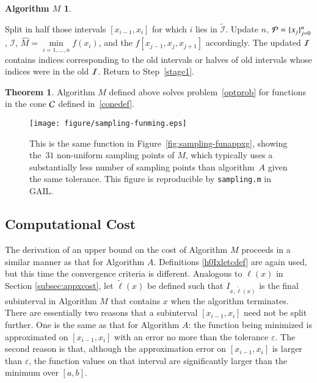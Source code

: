 \documentclass[review]{elsarticle}
\newcommand{\abstol}{\varepsilon}
\theoremstyle{definition}
\newtheorem*{algoM}{Algorithm $M$}
\newcommand{\scnote}[1]{ {\textcolor{orange}  {\mbox{**SC:} #1}}}
\newcommand{\tell}{\tilde{\ell}}
\newcommand{\hM}{\widehat{M}}
\newtheorem{theorem}{Theorem}
\newcommand{\minfi}{\min\limits_{i=1, \ldots,  n} f(x_i)} %
\begin{document}
\begin{algoM}
\begin{enumerate}[\em Step 1.]
		Split in half those intervals $[x_{i-1},x_i]$ for which $i$ lies in $\widetilde{\mathcal{I}}$.
		Update $n$, $\mathcal{P} = \{x_j\}_{j=0}^n$, $\mathcal{I}$, $\hM = \minfi$, and the $f[x_{j-1}, x_{j}, x_{j+1}]$ accordingly.  The updated $\mathcal{I}$ contains  indices corresponding to the old intervals or halves of old intervals whose indices were in the old $\mathcal{I}$.  Return to Step~\ref{stage1}.
	\end{enumerate}
\end{algoM}

\begin{theorem} \label{thm:algMworks}
Algorithm $M$ defined above solves problem~\eqref{optprob} for functions in the cone $\mathcal{C}$ defined in~\eqref{conedef}.
\end{theorem}

\begin{figure}[tbh]
\hspace{-9ex}
\texttt{[image: figure/sampling-funming.eps]}
\caption{This is the same function in Figure~\ref{fig:sampling-funappxg},
showing the~$31$ non-uniform sampling points of $M$, which typically uses a
substantially less number of sampling points than algorithm~$A$ given the same
tolerance. This figure is reproducible by {\tt sampling.m} in GAIL.}
\label{fig:sampling-funming}
\end{figure}

\subsection{Computational Cost} \label{subsec:optcost}
The derivation of an upper bound on the cost of Algorithm $M$ proceeds in a similar manner as that for Algorithm $A$.  Definitions \eqref{h0Ixletcdef} are again used, but this time the convergence criteria is different.  Analogous to $\ell(x)$ in Section \ref{subsec:appxcost}, let $\tell(x)$ be defined such that $I_{x,\tell(x)}$ is the final subinterval in Algorithm $M$ that contains $x$ when the algorithm terminates. There are essentially two reasons that a subinterval $[x_{i-1},x_i]$ need not be split further.  One is the same as that for Algorithm $A$:  the function being minimized is approximated on $[x_{i-1},x_i]$ with an error no more than the tolerance $\abstol$.  The second reason is that, although the approximation error on $[x_{i-1},x_i]$ is larger than $\abstol$, the function values on that interval are significantly larger than the minimum over $[a,b]$.  
\end{document}
